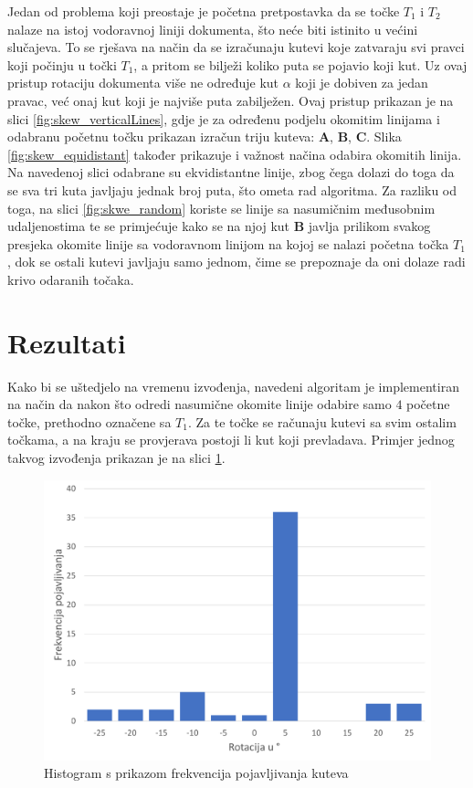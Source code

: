 \documentclass[times, utf8, zavrsni, numeric]{fer}
\begin{document}
Jedan od problema koji preostaje je početna pretpostavka da se točke $T_1$ i $T_2$ nalaze na istoj vodoravnoj liniji dokumenta, što neće biti istinito u većini slučajeva.
To se rješava na način da se izračunaju kutevi koje zatvaraju svi pravci koji počinju u točki $T_1$, a pritom se bilježi koliko puta se pojavio koji kut.
Uz ovaj pristup rotaciju dokumenta više ne određuje kut $\alpha$ koji je dobiven za jedan pravac, već onaj kut koji je najviše puta zabilježen.
Ovaj pristup prikazan je na slici \ref{fig:skew_verticalLines}, gdje je za određenu podjelu okomitim linijama i odabranu početnu točku prikazan izračun triju kuteva: \textbf{A}, \textbf{B}, \textbf{C}.
Slika \ref{fig:skew_equidistant} također prikazuje i važnost načina odabira okomitih linija.
Na navedenoj slici odabrane su ekvidistantne linije, zbog čega dolazi do toga da se sva tri kuta javljaju jednak broj puta, što ometa rad algoritma.
Za razliku od toga, na slici \ref{fig:skwe_random} koriste se linije sa nasumičnim međusobnim udaljenostima te se primjećuje kako se na njoj kut \textbf{B} javlja prilikom svakog presjeka okomite linije sa vodoravnom linijom na kojoj se nalazi početna točka $T_1$, dok se ostali kutevi javljaju samo jednom, čime se prepoznaje da oni dolaze radi krivo odaranih točaka.


\section{Rezultati}
Kako bi se uštedjelo na vremenu izvođenja, navedeni algoritam je implementiran na način da nakon što odredi nasumične okomite linije odabire samo $4$ početne točke, prethodno označene sa $T_1$.
Za te točke se računaju kutevi sa svim ostalim točkama, a na kraju se provjerava postoji li kut koji prevladava.
Primjer jednog takvog izvođenja prikazan je na slici \ref{fig:skew1}.\\

\begin{figure}[ht!]
    \centering
    \includegraphics[width=.8\textwidth]{Images/Skew1.pdf}
    \captionsetup{justification=centering}
    \caption{Histogram s prikazom frekvencija pojavljivanja kuteva}
    \label{fig:skew1}
\end{figure}
\end{document}
